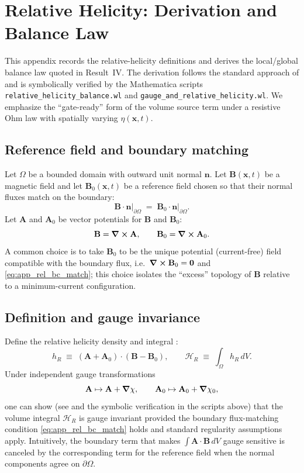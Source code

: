 \documentclass[11pt]{article}
\theoremstyle{plain}
\theoremstyle{definition}
\theoremstyle{remark}
\newcommand{\A}{\mathbf{A}}
\newcommand{\B}{\mathbf{B}}
\begin{document}
\section{Relative Helicity: Derivation and Balance Law}\label{sec:app_relative_helicity}

This appendix records the relative-helicity definitions and derives the local/global balance law quoted
in Result~IV. The derivation follows the standard approach of \cite{FinnAntonsen1985} and is
symbolically verified by the Mathematica scripts \texttt{relative\_helicity\_balance.wl} and
\texttt{gauge\_and\_relative\_helicity.wl}. We emphasize the ``gate-ready'' form of the volume source
term under a resistive Ohm law with spatially varying $\eta(\mathbf{x},t)$.

\subsection{Reference field and boundary matching}
Let $\Omega$ be a bounded domain with outward unit normal $\mathbf{n}$. Let $\B(\mathbf{x},t)$ be a
magnetic field and let $\B_0(\mathbf{x},t)$ be a reference field chosen so that their normal fluxes
match on the boundary:
\begin{equation}\label{eq:app_rel_bc_match}
  \B\cdot\mathbf{n}\big|_{\partial\Omega} \;=\; \B_0\cdot\mathbf{n}\big|_{\partial\Omega}.
\end{equation}
Let $\A$ and $\A_0$ be vector potentials for $\B$ and $\B_0$:
\begin{equation}\label{eq:app_rel_potentials}
  \B=\curl\A,
  \qquad
  \B_0=\curl\A_0.
\end{equation}
A common choice is to take $\B_0$ to be the unique potential (current-free) field compatible with the
boundary flux, i.e.\ $\curl\B_0=\mathbf{0}$ and \eqref{eq:app_rel_bc_match}; this choice isolates the
``excess'' topology of $\B$ relative to a minimum-current configuration.

\subsection{Definition and gauge invariance}
Define the relative helicity density and integral \cite{FinnAntonsen1985}:
\begin{equation}\label{eq:app_rel_def}
  h_R \;\equiv\; (\A+\A_0)\cdot(\B-\B_0),
  \qquad
  \mathcal{H}_R \;\equiv\; \int_{\Omega} h_R\,dV.
\end{equation}
Under independent gauge transformations
\[
\A\mapsto\A+\grad\chi,\qquad \A_0\mapsto\A_0+\grad\chi_0,
\]
one can show (see \cite{FinnAntonsen1985} and the symbolic verification in the scripts above) that the
volume integral $\mathcal{H}_R$ is gauge invariant provided the boundary flux-matching condition
\eqref{eq:app_rel_bc_match} holds and standard regularity assumptions apply. Intuitively, the boundary
term that makes $\int\A\cdot\B\,dV$ gauge sensitive is canceled by the corresponding term for the
reference field when the normal components agree on $\partial\Omega$.
\end{document}
